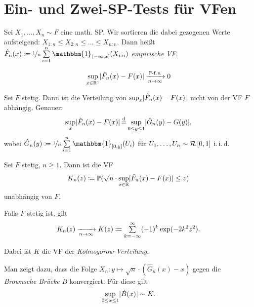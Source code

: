 \documentclass{cheat-sheet}
\renewcommand{\P}{\mathbb{P}} %
\newcommand{\ind}{\mathbbm{1}} %
\DeclareMathOperator*{\eqqd}{\stackrel{d}{=}} %
\newcommand{\iid}{i.\,i.\,d.} %
\newcommand{\Uniform}{\mathcal{R}} %
\begin{document}
\section{Ein- und Zwei-SP-Tests für VFen}

\begin{situation}
  Sei $X_1, \ldots, X_n \sim F$ eine math. SP.
  Wir sortieren die dabei gezogenen Werte aufsteigend: $X_{1:n} \leq X_{2:n} \leq \ldots \leq X_{n:n}$.
  Dann heißt $\hat{F}_n(x) \coloneqq \nicefrac{1}{n} \sum_{i=1}^n \ind_{\ocinterval{-\infty}{x}}(X_{i:n})$ \emph{empirische VF}.
\end{situation}

\begin{satz}
  \[ \sup_{x \in \R^1} \abs{\hat{F}_n(x) - F(x)} \xra[n \to \infty]{\text{$\P$-f.\,s.}} 0 \]
\end{satz}

\begin{lem}
  Sei $F$ stetig.
  Dann ist die Verteilung von $\sup_x \lvert\hat{F}_n(x) - F(x)\rvert$ nicht von der VF $F$ abhängig.
  Genauer:
  \[ \sup_x \abs{\hat{F}_n(x) - F(x)} \eqqd \sup_{0 \leq y \leq 1} \abs{\hat{G}_n(y) - G(y)}, \]
  wobei $\hat{G}_n(y) \coloneqq \nicefrac{1}{n} \sum_{i=1}^n \ind_{\cinterval{0}{y}}(U_i)$ für $U_1, \ldots, U_n \sim \Uniform \cinterval{0}{1}$ \iid{}
\end{lem}


\begin{kor}
  Sei $F$ stetig, $n \geq 1$.
  Dann ist die VF
  \[ K_n(z) \coloneqq \P(\sqrt{n} \cdot \sup_{x \in \R} \abs{\hat{F}_n(x) - F(x)} \leq z) \]
  unabhängig von $F$.
\end{kor}

\begin{satz}
  Falls $F$ stetig ist, gilt
  \[ K_n(z) \xra[n \to \infty]{} K(z) \coloneqq \sum_{k = - \infty}^\infty (-1)^k \exp(-2 k^2 z^2). \]
\end{satz}

\begin{defn}
  Dabei ist $K$ die VF der \emph{Kolmogorow-Verteilung}.
\end{defn}

\begin{bem}
  Man zeigt dazu, dass die Folge $X_n : y \mapsto \sqrt{n} \cdot (\hat{G}_n(x) - x)$ gegen die \emph{Brownsche Brücke} $\dot{B}$ konvergiert.
  Für diese gilt
  \[ \sup_{0 \leq x \leq 1} \lvert\dot{B}(x)\rvert \sim K. \]
\end{bem}
\end{document}
